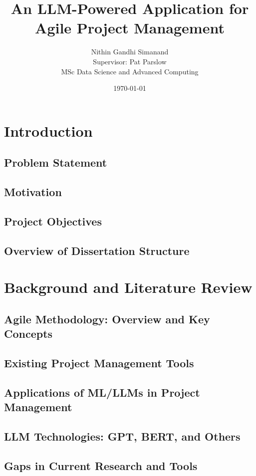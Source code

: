 \documentclass[12pt,a4paper]{report}
\title{\textbf{An LLM-Powered Application for Agile Project Management}}
\author{Nithin Gandhi Simanand \\ Supervisor: Pat Parslow \\ MSc Data Science and Advanced Computing}
\date{\today}
\begin{document}
\maketitle

\tableofcontents
\newpage

\chapter{Introduction}  %
\section{Problem Statement}
\section{Motivation}
\section{Project Objectives}
\section{Overview of Dissertation Structure}

\chapter{Background and Literature Review}  %
\section{Agile Methodology: Overview and Key Concepts}
\section{Existing Project Management Tools}
\section{Applications of ML/LLMs in Project Management}
\section{LLM Technologies: GPT, BERT, and Others}
\section{Gaps in Current Research and Tools}
\end{document}
